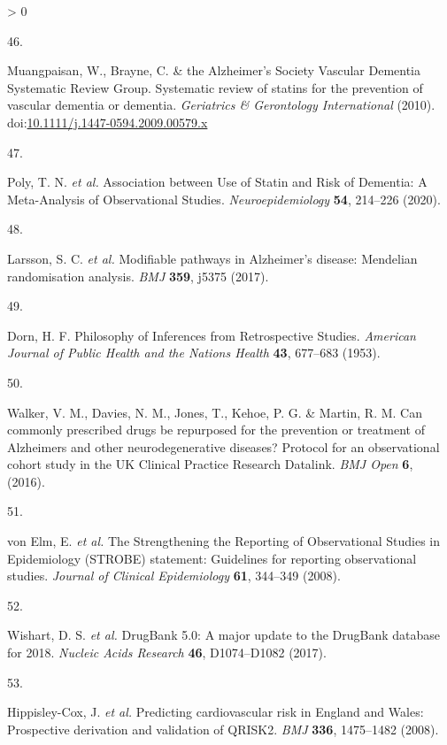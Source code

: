 \documentclass[a4paper, twoside]{templates/ociamthesis}
\newlength{\cslhangindent}
\newlength{\csllabelwidth}
\newenvironment{CSLReferences}[3] %
 {%
  \setlength{\parindent}{0pt}
  \ifodd #1 \everypar{\setlength{\hangindent}{\cslhangindent}}\ignorespaces\fi
  \ifnum #2 > 0
  \setlength{\parskip}{#2\baselineskip}
  \fi
 }%
 {}
\newcommand{\CSLLeftMargin}[1]{\parbox[t]{\maxof{\widthof{#1}}{\csllabelwidth}}{#1}}
\newcommand{\CSLRightInline}[1]{\parbox[t]{\linewidth - \csllabelwidth}{#1}}
\begin{document}
\begin{CSLReferences}{0}{0}
\leavevmode\hypertarget{ref-muangpaisan2010}{}%
\CSLLeftMargin{46. }
\CSLRightInline{Muangpaisan, W., Brayne, C. \& the Alzheimer's Society Vascular Dementia Systematic Review Group. Systematic review of statins for the prevention of vascular dementia or dementia. \emph{Geriatrics \& Gerontology International} (2010). doi:\href{https://doi.org/10.1111/j.1447-0594.2009.00579.x}{10.1111/j.1447-0594.2009.00579.x}}

\leavevmode\hypertarget{ref-poly2020b}{}%
\CSLLeftMargin{47. }
\CSLRightInline{Poly, T. N. \emph{et al.} Association between {Use} of {Statin} and {Risk} of {Dementia}: {A Meta}-{Analysis} of {Observational Studies}. \emph{Neuroepidemiology} \textbf{54}, 214--226 (2020).}

\leavevmode\hypertarget{ref-larsson2017a}{}%
\CSLLeftMargin{48. }
\CSLRightInline{Larsson, S. C. \emph{et al.} Modifiable pathways in {Alzheimer}'s disease: {Mendelian} randomisation analysis. \emph{BMJ} \textbf{359}, j5375 (2017).}

\leavevmode\hypertarget{ref-dorn1953}{}%
\CSLLeftMargin{49. }
\CSLRightInline{Dorn, H. F. Philosophy of {Inferences} from {Retrospective Studies}. \emph{American Journal of Public Health and the Nations Health} \textbf{43}, 677--683 (1953).}

\leavevmode\hypertarget{ref-walker2016a}{}%
\CSLLeftMargin{50. }
\CSLRightInline{Walker, V. M., Davies, N. M., Jones, T., Kehoe, P. G. \& Martin, R. M. Can commonly prescribed drugs be repurposed for the prevention or treatment of {Alzheimers} and other neurodegenerative diseases? {Protocol} for an observational cohort study in the {UK Clinical Practice Research Datalink}. \emph{BMJ Open} \textbf{6}, (2016).}

\leavevmode\hypertarget{ref-vonelm2008}{}%
\CSLLeftMargin{51. }
\CSLRightInline{von Elm, E. \emph{et al.} The {Strengthening} the {Reporting} of {Observational Studies} in {Epidemiology} ({STROBE}) statement: Guidelines for reporting observational studies. \emph{Journal of Clinical Epidemiology} \textbf{61}, 344--349 (2008).}

\leavevmode\hypertarget{ref-wishart2017}{}%
\CSLLeftMargin{52. }
\CSLRightInline{Wishart, D. S. \emph{et al.} {DrugBank} 5.0: A major update to the {DrugBank} database for 2018. \emph{Nucleic Acids Research} \textbf{46}, D1074--D1082 (2017).}

\leavevmode\hypertarget{ref-hippisley-cox2008}{}%
\CSLLeftMargin{53. }
\CSLRightInline{Hippisley-Cox, J. \emph{et al.} Predicting cardiovascular risk in {England} and {Wales}: Prospective derivation and validation of {QRISK2}. \emph{BMJ} \textbf{336}, 1475--1482 (2008).}


\end{CSLReferences}
\end{document}
